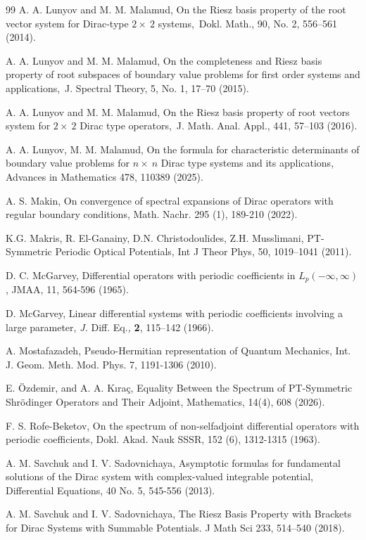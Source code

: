 \documentclass{article}%
\begin{document}
\begin{thebibliography}{99}
\bibitem {}A. A. Lunyov and M. M. Malamud, On the Riesz basis property of the
root vector system for Dirac-type $2\times\ 2$ systems,\ Dokl. Math., 90, No.
2, 556--561 (2014).

\bibitem {}A. A. Lunyov and M. M. Malamud, On the completeness and Riesz basis
property of root subspaces of boundary value problems for first order systems
and applications,\ J. Spectral Theory, 5, No. 1, 17--70 (2015).

\bibitem {}A. A. Lunyov and M. M. Malamud, On the Riesz basis property of root
vectors system for $2\times\ 2$ Dirac type operators,\ J. Math. Anal. Appl.,
441, 57--103 (2016).

\bibitem {}A. A. Lunyov, M. M. Malamud, On the formula for characteristic
determinants of boundary value problems for $n\times\ n$ Dirac type systems
and its applications, Advances in Mathematics 478, 110389 (2025).

\bibitem {}A. S. Makin, On convergence of spectral expansions of Dirac
operators with regular boundary conditions, Math. Nachr. 295 (1), 189-210 (2022).

\bibitem {}K.G. Makris, R. El-Ganainy, D.N. Christodoulides, Z.H. Musslimani,
PT-Symmetric Periodic Optical Potentials, Int J Theor Phys, 50, 1019--1041 (2011).

\bibitem {}D. C. McGarvey, Differential operators with periodic coefficients
in $L_{p}(-\infty,\infty)$, JMAA, {11}, 564-596 (1965).

\bibitem {}D. McGarvey, Linear differential systems with periodic coefficients
involving a large parameter, \textit{J. }Diff. Eq.\textit{,} \textbf{2},
115--142 (1966).

\bibitem {}A. Mostafazadeh, Pseudo-Hermitian representation of Quantum
Mechanics, Int. J. Geom. Meth. Mod. Phys. 7, 1191-1306 (2010).

\bibitem {}E. \"{O}zdemir, and A. A. K\i ra\c{c}, Equality Between the
Spectrum of PT-Symmetric Shr\"{o}dinger Operators and Their Adjoint,
Mathematics, 14(4), 608 (2026).

\bibitem {}F. S. Rofe-Beketov, On the spectrum of non-selfadjoint differential
operators with periodic coefficients, Dokl. Akad. Nauk SSSR, 152 (6),
1312-1315 (1963).

\bibitem {}A. M. Savchuk and I. V. Sadovnichaya, Asymptotic formulas for
fundamental solutions of the Dirac system with complex-valued integrable
potential, Differential Equations, 40 No. 5, 545-556 (2013).

\bibitem {}A. M. Savchuk and I. V. Sadovnichaya, The Riesz Basis Property with
Brackets for Dirac Systems with Summable Potentials. J Math Sci 233, 514--540 (2018).


\end{thebibliography}
\end{document}
